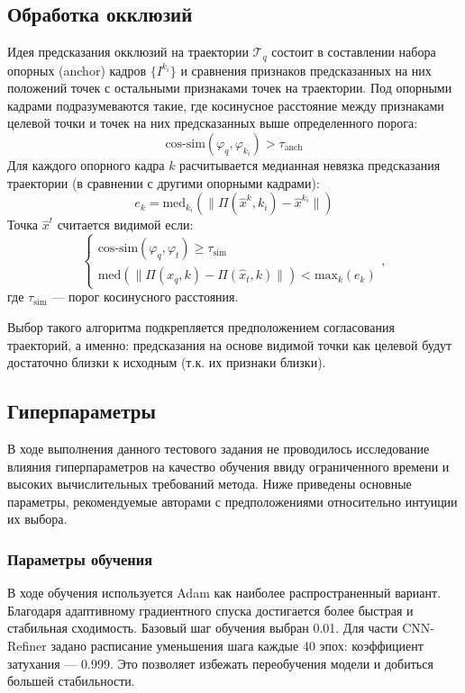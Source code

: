 \documentclass[a4paper, 14pt]{extarticle}
\theoremstyle{definition}
\theoremstyle{plain}
\theoremstyle{remark}
\begin{document}
\subsection{Обработка окклюзий}
Идея предсказания окклюзий на траектории $\mathcal{T}_q$ состоит в составлении набора опорных (anchor) кадров $\{I^{k_i}\}$ и сравнения признаков предсказанных на них положений точек с остальными признаками точек на траектории. Под опорными кадрами подразумеваются такие, где косинусное расстояние между признаками целевой точки и точек на них предсказанных выше определенного порога:
\begin{equation} \label{eq:anch}
	\text{cos-sim}(\varphi_q,\varphi_{k_i}) > \tau_{\text{anch}}
\end{equation}
Для каждого опорного кадра $k$ расчитывается медианная невязка предсказания траектории (в сравнении с другими опорными кадрами):
\begin{equation}
	e_{k} = \text{med}_{k_i}(\|\Pi(\hat{x}^k,k_i) - \hat{x}^{k_i}\|)
\end{equation}
Точка $\hat{x}^t$ считается видимой если:
\begin{equation} \label{eq:occl}
	\begin{cases}
		\text{cos-sim}(\varphi_q, \varphi_t) \ge \tau_{\text{sim}}\\
		\text{med}(\|\Pi(x_q, k) - \Pi(\hat{x}_t, k)\|) < \text{max}_k(e_k)
	\end{cases},
\end{equation}
где $\tau_{\text{sim}}$ --- порог косинусного расстояния. 

Выбор такого алгоритма подкрепляется предположением согласования траекторий, а именно: предсказания на основе видимой точки как целевой будут достаточно близки к исходным (т.к. их признаки близки).

\subsection{Гиперпараметры}
В ходе выполнения данного тестового задания не проводилось исследование влияния гиперпараметров на качество обучения ввиду ограниченного времени и высоких вычислительных требований метода. Ниже приведены основные параметры, рекомендуемые авторами с предположениями относительно интуиции их выбора.
\subsubsection{Параметры обучения}
В ходе обучения используется Adam как наиболее распространенный вариант. Благодаря адаптивному градиентного спуска достигается более быстрая и стабильная сходимость.
Базовый шаг обучения выбран 0.01. Для части CNN-Refiner задано расписание уменьшения шага каждые 40 эпох: коэффициент затухания --- 0.999. Это позволяет избежать переобучения модели и добиться большей стабильности.
\end{document}
